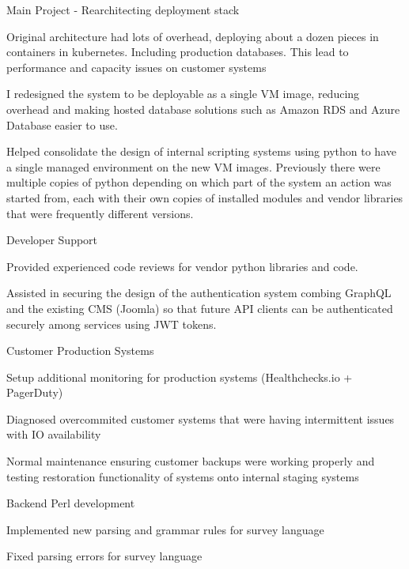 \documentclass[table,tmargin=1in,bmargin=1in,letterpaper]{resume}
\begin{document}
\begin{compactitem}
\item Main Project - Rearchitecting deployment stack
  \begin{compactitem}
  \item Original architecture had lots of overhead, deploying about a dozen pieces in containers in kubernetes.  Including production databases.  This lead to performance and capacity issues on customer systems
  \item I redesigned the system to be deployable as a single VM image, reducing overhead and making hosted database solutions such as Amazon RDS and Azure Database easier to use.
  \item Helped consolidate the design of internal scripting systems using python to have a single managed environment on the new VM images.  Previously there were multiple copies of python depending on which part of the system an action was started from, each with their own copies of installed modules and vendor libraries that were frequently different versions.
  \end{compactitem}
\item Developer Support
  \begin{compactitem}
  \item Provided experienced code reviews for vendor python libraries and code.
  \item Assisted in securing the design of the authentication system combing GraphQL and the existing CMS (Joomla) so that future API clients can be authenticated securely among services using JWT tokens.
  \end{compactitem}
\item Customer Production Systems
  \begin{compactitem}
  \item Setup additional monitoring for production systems (Healthchecks.io + PagerDuty)
  \item Diagnosed overcommited customer systems that were having intermittent issues with IO availability
  \item Normal maintenance ensuring customer backups were working properly and testing restoration functionality of systems onto internal staging systems  
  \end{compactitem}
\end{compactitem}

\begin{compactitem}
\item Backend Perl development
  \begin{compactitem}
  \item Implemented new parsing and grammar rules for survey language
  \item Fixed parsing errors for survey language
  \end{compactitem}
\end{compactitem}
\end{document}

